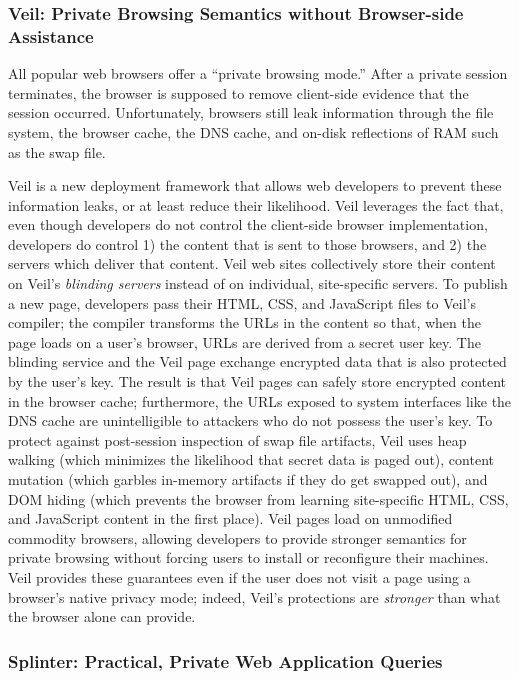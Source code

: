 \subsubsection{Veil: Private Browsing Semantics without Browser-side Assistance}
All popular web browsers offer a ``private browsing
mode.'' After a private session terminates, the
browser is supposed to remove client-side
evidence that the session occurred. Unfortunately,
browsers still leak information through the file
system, the browser cache, the DNS cache, and
on-disk reflections of RAM such as the swap file.

Veil is a new deployment framework that allows
web developers to prevent these information leaks,
or at least reduce their likelihood. Veil leverages
the fact that, even though developers do not control the
client-side browser implementation, developers do
control 1) the content that is sent to those browsers,
and 2) the servers which deliver that content.
Veil web sites collectively store their content
on Veil's \emph{blinding servers} instead
of on individual, site-specific servers. To publish
a new page, developers pass their HTML, CSS, and
JavaScript files to Veil's compiler; the compiler
transforms the URLs in the content so that, when
the page loads on a user's browser, URLs are derived
from a secret user key. The blinding service and
the Veil page exchange encrypted
data that is also protected by the user's key. The
result is that Veil pages can safely store encrypted
content in the browser cache; furthermore, the URLs exposed
to system interfaces like the DNS cache are
unintelligible to attackers who do not possess
the user's key. To protect against post-session
inspection of swap file artifacts, Veil uses
heap walking (which minimizes the likelihood that
secret data is paged out), content mutation (which
garbles in-memory artifacts if they do get swapped out),
and DOM hiding (which prevents the browser from
learning site-specific HTML, CSS, and JavaScript
content in the first place). Veil pages load on unmodified
commodity browsers, allowing developers to provide
stronger semantics for private browsing without forcing
users to install or reconfigure their machines. Veil
provides these guarantees even if the user does not
visit a page using a browser's native privacy mode;
indeed, Veil's protections are \emph{stronger}
than what the browser alone can provide.

\subsubsection{Splinter: Practical, Private Web Application Queries}

